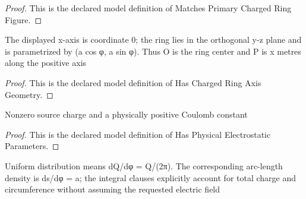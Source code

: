 \begin{proof}
  This is the declared model definition of Matches Primary Charged Ring Figure.
\end{proof}
\begin{definition}
  \label{def:physics:phyx-mini-0995:phyxminiproblems-problemphyxmini0995-haschargedringaxisgeometry}
  The displayed x-axis is coordinate 0; the ring lies in the orthogonal y-z plane and is parametrized by (a cos φ, a sin φ). Thus O is the ring center and P is x metres along the positive axis
\end{definition}
\begin{proof}
  This is the declared model definition of Has Charged Ring Axis Geometry.
\end{proof}
\begin{definition}
  \label{def:physics:phyx-mini-0995:phyxminiproblems-problemphyxmini0995-hasphysicalelectrostaticparameters}
  Nonzero source charge and a physically positive Coulomb constant
\end{definition}
\begin{proof}
  This is the declared model definition of Has Physical Electrostatic Parameters.
\end{proof}
\begin{definition}
  \label{def:physics:phyx-mini-0995:phyxminiproblems-problemphyxmini0995-satisfiesuniformringdistribution}
  Uniform distribution means dQ/dφ = Q/(2π). The corresponding arc-length density is ds/dφ = a; the integral clauses explicitly account for total charge and circumference without assuming the requested electric field
\end{definition}
